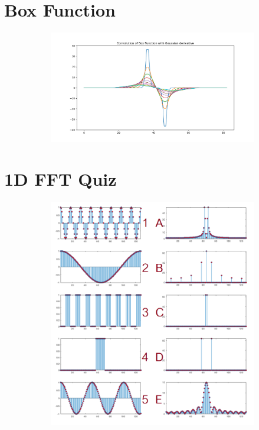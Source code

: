 \documentclass[12pt, oneside]{article}
\begin{document}
\section{Box Function}


\begin{figure}[H]
    \centering
    \begin{subfigure}[b]{1\textwidth}
        \centering
        \includegraphics[width=\textwidth]{imgs/q4_plot.png}
    \end{subfigure}
    \caption{}
\end{figure}

\section{1D FFT Quiz}

\begin{figure}[H]
    \centering
    \begin{subfigure}[b]{1\textwidth}
        \centering
        \includegraphics[width=\textwidth]{imgs/q5_matching.png}
    \end{subfigure}
    \caption{}
\end{figure}
\end{document}
